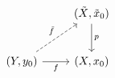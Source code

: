 \documentclass{article}
\begin{document}
    \begin{equation*}
        \begin{tikzcd}[row sep = 0.35in]
            & (\tilde{X},\tilde{x}_0) \ar[d, "p"] \\
            \tpl{Y,y_0} \ar[ur, "\tilde{f}", dashed] \ar[r, "f"'] & \tpl{X,x_0}
        \end{tikzcd}
    \end{equation*}
\end{document}
